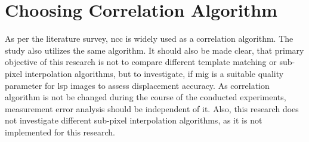     \section{Choosing Correlation Algorithm}        
        As per the literature survey, \gls{ncc} is widely used as a correlation algorithm. The study also utilizes the same algorithm. It should also be made clear, that primary objective of this research is not to compare different template matching or sub-pixel interpolation algorithms, but to investigate, if \gls{mig} is a suitable quality parameter for \gls{lsp} images to assess displacement accuracy. As correlation algorithm is not be changed during the course of the conducted experiments, measurement error analysis should be independent of it. Also, this research does not investigate different sub-pixel interpolation algorithms, as it is not implemented for this research.
    
    
     